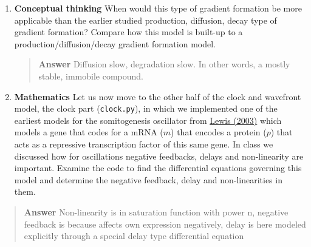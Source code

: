 \documentclass[
  letterpaper,
  DIV=11,
  numbers=noendperiod]{scrreprt}
\theoremstyle{definition}
\theoremstyle{remark}
\begin{document}
\begin{enumerate}
\def\labelenumi{\arabic{enumi}.}
\setcounter{enumi}{1}
\item
  \textbf{Conceptual thinking} When would this type of gradient
  formation be more applicable than the earlier studied production,
  diffusion, decay type of gradient formation? Compare how this model is
  built-up to a production/diffusion/decay gradient formation model.

  \begin{quote}
  \textbf{Answer} Diffusion slow, degradation slow. In other words, a
  mostly stable, immobile compound.
  \end{quote}
\item
  \textbf{Mathematics} Let us now move to the other half of the clock
  and wavefront model, the clock part (\texttt{clock.py}), in which we
  implemented one of the earliest models for the somitogenesis
  oscillator from
  \href{https://doi.org/10.1016/S0960-9822(03)00534-7}{Lewis (2003)}
  which models a gene that codes for a mRNA (\(m\)) that encodes a
  protein (\(p\)) that acts as a repressive transcription factor of this
  same gene. In class we discussed how for oscillations negative
  feedbacks, delays and non-linearity are important. Examine the code to
  find the differential equations governing this model and determine the
  negative feedback, delay and non-linearities in them.
\end{enumerate}

\begin{quote}
\textbf{Answer} Non-linearity is in saturation function with power n,
negative feedback is because affects own expression negatively, delay is
here modeled explicitly through a special delay type differential
equation
\end{quote}
\end{document}
